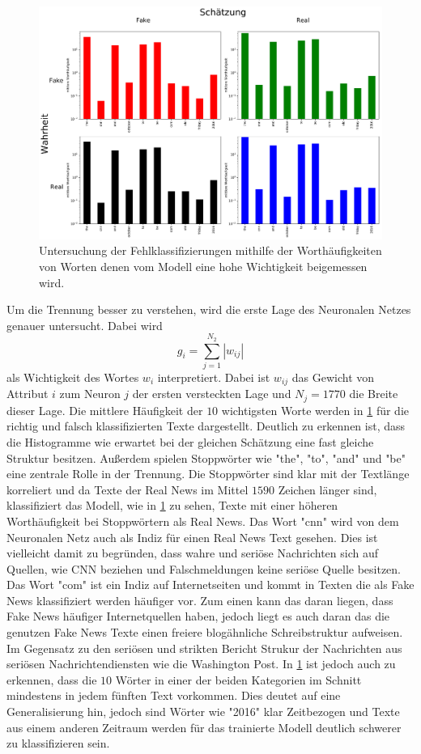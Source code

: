 \begin{figure}
    \centering
    \includegraphics[width=\textwidth]{pictures/cnfn_hist.pdf}
    \caption{Untersuchung der Fehlklassifizierungen mithilfe der Worthäufigkeiten von Worten denen vom 
            Modell eine hohe Wichtigkeit beigemessen wird.}
    \label{fig:CM_i}
\end{figure}
Um die Trennung besser zu verstehen, wird die erste Lage des Neuronalen Netzes genauer untersucht.
Dabei wird
\begin{equation}
    g_i = \sum_{j=1}^{N_2}|w_{ij}|
\end{equation}
als Wichtigkeit des Wortes $w_i$ interpretiert. Dabei ist $w_{ij}$ das Gewicht von Attribut $i$ zum Neuron $j$ der 
ersten versteckten Lage und $N_j=1770$ die Breite dieser Lage.
Die mittlere Häufigkeit der $10$ wichtigsten Worte werden in \ref{fig:CM_i} für die richtig und falsch klassifizierten 
Texte dargestellt.
Deutlich zu erkennen ist, dass die Histogramme wie erwartet bei der gleichen Schätzung eine fast gleiche Struktur besitzen.
Außerdem spielen Stoppwörter wie "the", "to", "and" und "be" eine zentrale Rolle in der Trennung.
Die Stoppwörter sind klar mit der Textlänge korreliert und da Texte der Real News im Mittel $\num{1590}$ Zeichen 
länger sind, klassifiziert das Modell, wie in \ref{fig:CM_i} zu sehen, Texte mit einer höheren Worthäufigkeit bei Stoppwörtern 
als Real News.
Das Wort "cnn" wird von dem Neuronalen Netz auch als Indiz für einen Real News Text gesehen.
Dies ist vielleicht damit zu begründen, dass wahre und seriöse Nachrichten sich auf Quellen, wie CNN beziehen und 
Falschmeldungen keine seriöse Quelle besitzen.
Das Wort "com" ist ein Indiz auf Internetseiten und kommt in Texten die als Fake News klassifiziert werden häufiger 
vor.
Zum einen kann das daran liegen, dass Fake News häufiger Internetquellen haben, jedoch liegt es auch daran das die 
genutzen Fake News Texte einen freiere blogähnliche Schreibstruktur aufweisen. 
Im Gegensatz zu den seriösen und strikten Bericht Strukur der Nachrichten aus seriösen Nachrichtendiensten wie die 
Washington Post.
In \ref{fig:CM_i} ist jedoch auch zu erkennen, dass die $10$ Wörter in einer der beiden Kategorien im Schnitt mindestens in 
jedem fünften Text vorkommen. 
Dies deutet auf eine Generalisierung hin, jedoch sind Wörter wie "2016" klar Zeitbezogen und Texte aus einem anderen 
Zeitraum werden für das trainierte Modell deutlich schwerer zu klassifizieren sein. 

